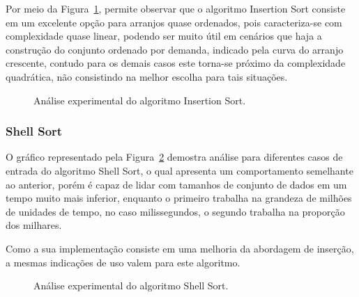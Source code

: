 \documentclass[conference]{IEEEtran}
\begin{document}
Por meio da Figura~\ref{image: graph-insertion}, permite observar que o algoritmo Insertion Sort consiste em um excelente opção para arranjos quase ordenados, pois caracteriza-se com complexidade quase linear, podendo ser muito útil em cenários que haja a construção do conjunto ordenado por demanda, indicado pela curva do arranjo crescente, contudo para os demais casos este torna-se próximo da complexidade quadrática, não consistindo na melhor escolha para tais situações.

\begin{figure}

\centering
{}
\caption{Análise experimental do algoritmo Insertion Sort.}
\label{image: graph-insertion}
\end{figure}

\subsubsection{Shell Sort}
O gráfico representado pela Figura~\ref{image: graph-shell} demostra análise para diferentes casos de entrada do algoritmo Shell Sort, o qual apresenta um comportamento semelhante ao anterior, porém é capaz de lidar com tamanhos de conjunto de dados em um tempo muito mais inferior, enquanto o primeiro trabalha na grandeza de milhões de unidades de tempo, no caso milissegundos, o segundo trabalha na proporção dos milhares. 

Como a sua implementação consiste em uma melhoria da abordagem de inserção, a mesmas indicações de uso valem para este algoritmo.


\begin{figure}

\centering
{}
\caption{Análise experimental do algoritmo Shell Sort.}
\label{image: graph-shell}
\end{figure}
\end{document}

